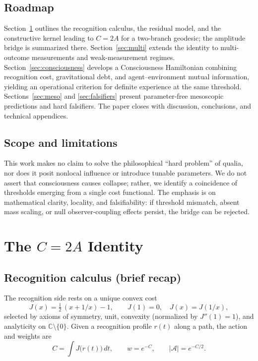 \documentclass[reprint,aps,prd,nofootinbib]{revtex4-2}
\begin{document}
\subsection{Roadmap}
Section~\ref{sec:CeqTwoA} outlines the recognition calculus, the residual model, and the constructive kernel leading to \(C=2A\) for a two-branch geodesic; the amplitude bridge is summarized there. Section~\ref{sec:multi} extends the identity to multi-outcome measurements and weak-measurement regimes. Section~\ref{sec:consciousness} develops a Consciousness Hamiltonian combining recognition cost, gravitational debt, and agent--environment mutual information, yielding an operational criterion for definite experience at the same threshold. Sections~\ref{sec:meso} and \ref{sec:falsifiers} present parameter-free mesoscopic predictions and hard falsifiers. The paper closes with discussion, conclusions, and technical appendices.

\subsection{Scope and limitations}
This work makes no claim to solve the philosophical ``hard problem'' of qualia, nor does it posit nonlocal influence or introduce tunable parameters. We do not assert that consciousness causes collapse; rather, we identify a coincidence of thresholds emerging from a single cost functional. The emphasis is on mathematical clarity, locality, and falsifiability: if threshold mismatch, absent mass scaling, or null observer-coupling effects persist, the bridge can be rejected.

\section{The $C=2A$ Identity}
\label{sec:CeqTwoA}

\subsection{Recognition calculus (brief recap)}
The recognition side rests on a unique convex cost
\begin{equation}
  J(x)=\tfrac{1}{2}\,(x+1/x)-1,\qquad J(1)=0,\quad J(x)=J(1/x),\label{eq:Jcost}
\end{equation}
selected by axioms of symmetry, unit, convexity (normalized by $J''(1)=1$), and analyticity on $\mathbb{C}\setminus\{0\}$. Given a recognition profile $r(t)$ along a path, the action and weights are
\begin{equation}
  C=\int J\big(r(t)\big)\,dt,\qquad w=e^{-C},\qquad |\mathcal{A}|=e^{-C/2}.\label{eq:Cdef}
\end{equation}
\end{document}
